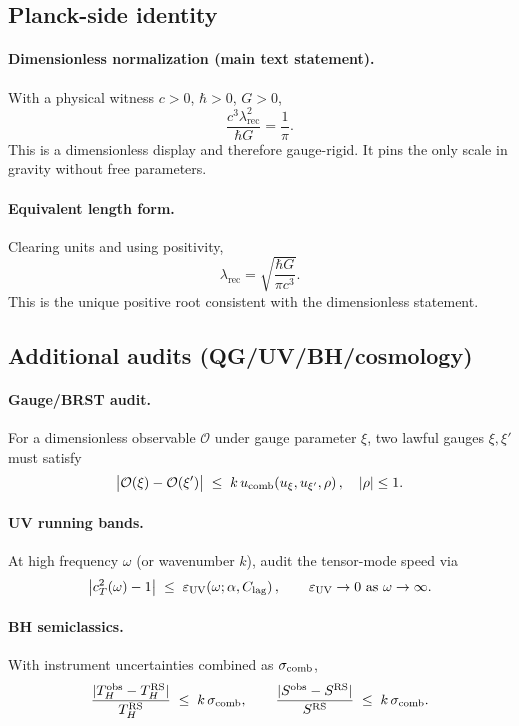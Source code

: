 \documentclass[11pt]{article}
\begin{document}
\subsection{Planck-side identity}\label{subsec:planck-id}

\paragraph{Dimensionless normalization (main text statement).}
With a physical witness $c>0$, $\hbar>0$, $G>0$,
\[
\boxed{\frac{c^3\lambda_{\mathrm{rec}}^{2}}{\hbar G} = \frac{1}{\pi}}.
\]
This is a dimensionless display and therefore gauge-rigid. It pins the only scale in gravity without free parameters.

\paragraph{Equivalent length form.}
Clearing units and using positivity,
\[
\boxed{\lambda_{\mathrm{rec}} = \sqrt{\frac{\hbar G}{\pi c^3}}}.
\]
This is the unique positive root consistent with the dimensionless statement. %

\subsection*{Additional audits (QG/UV/BH/cosmology)}
\paragraph{Gauge/BRST audit.}
For a dimensionless observable $\mathcal{O}$ under gauge parameter $\xi$, two lawful gauges $\xi,\xi'$ must satisfy
\[
\bigl|\mathcal{O}(\xi)-\mathcal{O}(\xi')\bigr|\;\le\; k\,u_{\rm comb}(u_\xi,u_{\xi'},\rho)\,,\quad |\rho|\le 1.
\]

\paragraph{UV running bands.}
At high frequency $\omega$ (or wavenumber $k$), audit the tensor-mode speed via
\[
\bigl|c_T^2(\omega)-1\bigr|\;\le\; \varepsilon_{\rm UV}(\omega;\alpha,C_{\rm lag})\,,\qquad \varepsilon_{\rm UV}\to 0\ \text{as}\ \omega\to\infty.
\]

\paragraph{BH semiclassics.}
With instrument uncertainties combined as $\sigma_{\rm comb}$,
\[
\frac{|T_H^{\rm obs}-T_H^{\rm RS}|}{T_H^{\rm RS}}\;\le\; k\,\sigma_{\rm comb},\qquad \frac{|S^{\rm obs}-S^{\rm RS}|}{S^{\rm RS}}\;\le\; k\,\sigma_{\rm comb}.
\]
\end{document}
